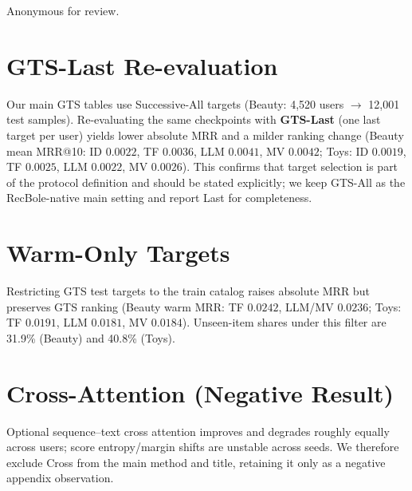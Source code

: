 \documentclass[sigconf,natbib=true,anonymous]{acmart}
\begin{document}
\begin{acks}
Anonymous for review.
\end{acks}




\appendix
\section{GTS-Last Re-evaluation}
\label{app:gts-last}

Our main GTS tables use Successive-All targets (Beauty: 4{,}520 users $\rightarrow$ 12{,}001 test samples).
Re-evaluating the same checkpoints with \textbf{GTS-Last} (one last target per user) yields lower absolute MRR and a milder ranking change (Beauty mean MRR@10: ID $0.0022$, TF $0.0036$, LLM $0.0041$, MV $0.0042$; Toys: ID $0.0019$, TF $0.0025$, LLM $0.0022$, MV $0.0026$).
This confirms that target selection is part of the protocol definition and should be stated explicitly; we keep GTS-All as the RecBole-native main setting and report Last for completeness.

\section{Warm-Only Targets}
\label{app:warm}

Restricting GTS test targets to the train catalog raises absolute MRR but preserves GTS ranking (Beauty warm MRR: TF $0.0242$, LLM/MV $0.0236$; Toys: TF $0.0191$, LLM $0.0181$, MV $0.0184$).
Unseen-item shares under this filter are 31.9\% (Beauty) and 40.8\% (Toys).

\section{Cross-Attention (Negative Result)}
\label{app:cross}

Optional sequence--text cross attention improves and degrades roughly equally across users; score entropy/margin shifts are unstable across seeds.
We therefore exclude Cross from the main method and title, retaining it only as a negative appendix observation.
\end{document}
